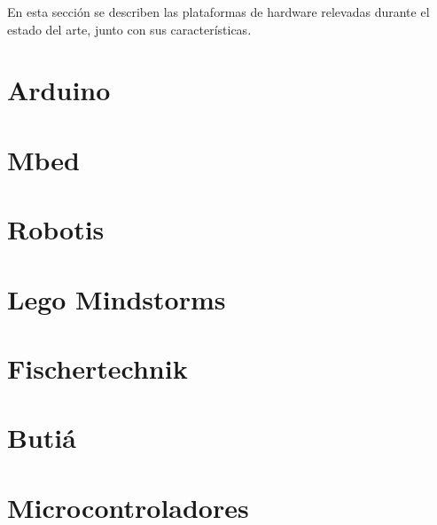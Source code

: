 
En esta sección se describen las plataformas de hardware relevadas
durante el estado del arte, junto con sus características.

\section{Arduino}


\section{Mbed}


\section{Robotis}


\section{Lego Mindstorms}


\section{Fischertechnik}


\section{Butiá}


\section{Microcontroladores}

